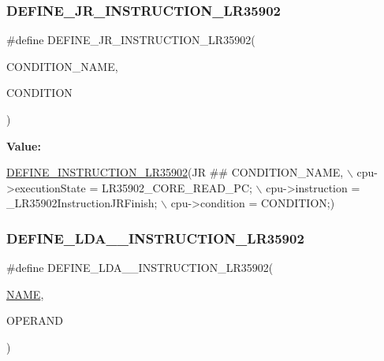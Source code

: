 \subsubsection{\texorpdfstring{D\+E\+F\+I\+N\+E\+\_\+\+J\+R\+\_\+\+I\+N\+S\+T\+R\+U\+C\+T\+I\+O\+N\+\_\+\+L\+R35902}{DEFINE\_JR\_INSTRUCTION\_LR35902}}
{\footnotesize\ttfamily \#define D\+E\+F\+I\+N\+E\+\_\+\+J\+R\+\_\+\+I\+N\+S\+T\+R\+U\+C\+T\+I\+O\+N\+\_\+\+L\+R35902(\begin{DoxyParamCaption}\item[{}]{C\+O\+N\+D\+I\+T\+I\+O\+N\+\_\+\+N\+A\+ME,  }\item[{}]{C\+O\+N\+D\+I\+T\+I\+ON }\end{DoxyParamCaption})}

{\bfseries Value\+:}
\begin{DoxyCode}
\mbox{\hyperlink{isa-lr35902_8c_a3128fc43c5d01e8b51f67901c0b4b5ef}{DEFINE\_INSTRUCTION\_LR35902}}(JR ## CONDITION\_NAME, \(\backslash\)
        cpu->executionState = LR35902\_CORE\_READ\_PC; \(\backslash\)
        cpu->instruction = \_LR35902InstructionJRFinish; \(\backslash\)
        cpu->condition = CONDITION;)
\end{DoxyCode}
\mbox{\label{isa-lr35902_8c_a55d7f65b51403e7d48734bc135f8bde8}} 
\subsubsection{\texorpdfstring{D\+E\+F\+I\+N\+E\+\_\+\+L\+D\+A\+\_\+\+\_\+\+I\+N\+S\+T\+R\+U\+C\+T\+I\+O\+N\+\_\+\+L\+R35902}{DEFINE\_LDA\_\_INSTRUCTION\_LR35902}}
{\footnotesize\ttfamily \#define D\+E\+F\+I\+N\+E\+\_\+\+L\+D\+A\+\_\+\+\_\+\+I\+N\+S\+T\+R\+U\+C\+T\+I\+O\+N\+\_\+\+L\+R35902(\begin{DoxyParamCaption}\item[{}]{\mbox{\hyperlink{inflate_8h_a164ea0159d5f0b5f12a646f25f99eceaa67bc2ced260a8e43805d2480a785d312}{N\+A\+ME}},  }\item[{}]{O\+P\+E\+R\+A\+ND }\end{DoxyParamCaption})}

